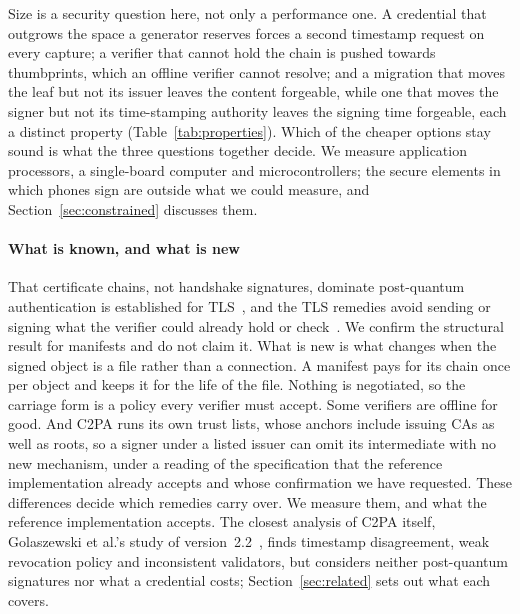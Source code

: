 Size is a security question here, not only a performance one. A credential
that outgrows the space a generator reserves forces a second timestamp request
on every capture; a verifier that cannot hold the chain is pushed towards
thumbprints, which an offline verifier cannot resolve; and a migration that
moves the leaf but not its issuer leaves the content forgeable, while one that
moves the signer but not its time-stamping authority leaves the signing time
forgeable, each a distinct property (Table~\ref{tab:properties}). Which of the
cheaper options stay sound is what the three questions together decide. We measure
application processors, a single-board computer and microcontrollers; the
secure elements in which phones sign are outside what we could measure, and
Section~\ref{sec:constrained} discusses them.

\paragraph{What is known, and what is new}
That certificate chains, not handshake signatures, dominate post-quantum
authentication is established for TLS~\cite{sikeridis2020ndss,paquin2020,%
sosnowski2023,westerbaan2021}, and the TLS remedies avoid sending or
signing what the verifier could already hold or
check~\cite{kampanakis2022scas,certabridge,merkletreecerts,schwabe2020kemtls}.
We confirm the structural result for manifests and do not claim it. What is
new is what changes when the signed object is a file rather than a connection.
A manifest pays for its chain once per object and keeps it for the life of the
file. Nothing is negotiated, so the carriage form is a policy every verifier
must accept. Some verifiers are offline for good. And C2PA runs its own trust
lists, whose anchors include issuing CAs as well as roots, so a signer under a
listed issuer can omit its intermediate with no new mechanism, under a reading
of the specification that the reference implementation already accepts and
whose confirmation we have requested. These differences decide which remedies
carry over. We measure them, and what the reference implementation accepts.
The closest analysis of C2PA itself, Golaszewski et al.'s study of
version~2.2~\cite{golaszewski2026eprint}, finds timestamp disagreement, weak
revocation policy and inconsistent validators, but considers neither
post-quantum signatures nor what a credential costs;
Section~\ref{sec:related} sets out what each covers.

